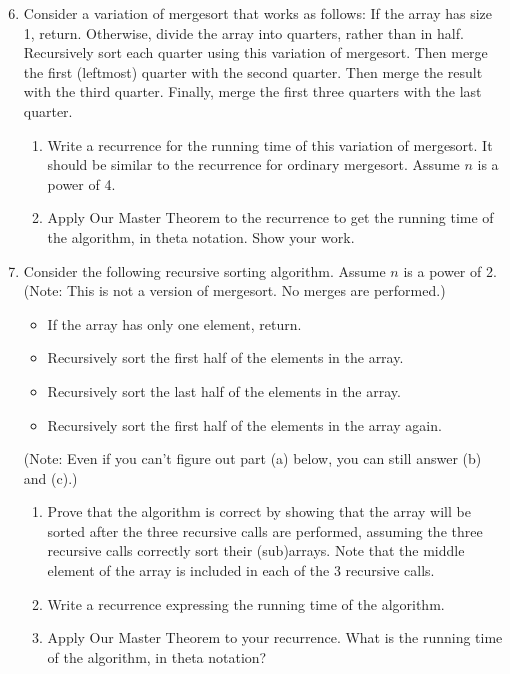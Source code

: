 \documentclass{article}
\begin{document}
\begin{enumerate}
    \setcounter{enumi}{5}
    \item Consider a variation of mergesort that works as follows: If the array has size 1, return. Otherwise, divide the array into quarters, rather than in half. Recursively sort each quarter using this variation of mergesort. Then merge the first (leftmost) quarter with the second quarter. Then merge the result with the third quarter. Finally, merge the first three quarters with the last quarter.
    \begin{enumerate}
        \item Write a recurrence for the running time of this variation of mergesort. It should be similar to the recurrence for ordinary mergesort. Assume $n$ is a power of 4.
        \item Apply Our Master Theorem to the recurrence to get the running time of the algorithm, in theta notation. Show your work.
    \end{enumerate}
\end{enumerate}

\begin{enumerate}
    \setcounter{enumi}{6}
    \item Consider the following recursive sorting algorithm. Assume $n$ is a power of 2. (Note: This is not a version of mergesort. No merges are performed.)
    \begin{itemize}
        \item If the array has only one element, return.
        \item Recursively sort the first half of the elements in the array.
        \item Recursively sort the last half of the elements in the array.
        \item Recursively sort the first half of the elements in the array again.
    \end{itemize}
    (Note: Even if you can’t figure out part (a) below, you can still answer (b) and (c).)
    \begin{enumerate}
        \item Prove that the algorithm is correct by showing that the array will be sorted after the three recursive calls are performed, assuming the three recursive calls correctly sort their (sub)arrays. Note that the middle element of the array is included in each of the 3 recursive calls.
        \item Write a recurrence expressing the running time of the algorithm.
        \item Apply Our Master Theorem to your recurrence. What is the running time of the algorithm, in theta notation?
    \end{enumerate}
\end{enumerate}
\end{document}
